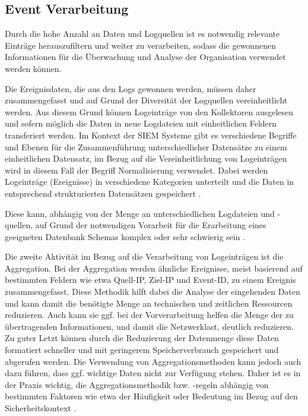 \subsection{Event Verarbeitung}
\label{cha:Event Verarbeitung}
Durch die hohe Anzahl an Daten und Logquellen ist es notwendig relevante Einträge herauszufiltern und weiter zu verarbeiten, sodass die gewonnenen Informationen für die Überwachung und Analyse der Organisation verwendet werden können.

Die Ereignisdaten, die aus den Logs gewonnen werden, müssen daher zusammengefasst und auf Grund der Diversität der Logquellen vereinheitlicht werden. Aus diesem Grund können Logeinträge von den Kollektoren ausgelesen und sofern möglich die Daten in neue Logdateien mit einheitlichen Feldern transferiert werden. Im Kontext der SIEM Systeme gibt es verschiedene Begriffe und Ebenen für die Zusammenführung unterschiedlicher Datensätze zu einem einheitlichen Datensatz, im Bezug auf die Vereinheitlichung von Logeinträgen wird in diesem Fall der Begriff \glqq Normalisierung \grqq  verwendet. Dabei werden Logeinträge (Ereignisse) in verschiedene Kategorien unterteilt und die Daten in entsprechend strukturierten Datensätzen gespeichert \citep{EP1}.

Diese kann, abhängig von der Menge an unterschiedlichen Logdateien und -quellen, auf Grund der notwendigen Vorarbeit für die Erarbeitung eines geeigneten Datenbank Schemas komplex oder sehr schwierig sein \citep{EP2}.

Die zweite Aktivität im Bezug auf die Verarbeitung von Logeinträgen ist die Aggregation. Bei der Aggregation werden ähnliche Ereignisse, meist basierend auf bestimmten Feldern wie etwa Quell-IP, Ziel-IP und Event-ID, zu einem Ereignis zusammengefasst. Diese Methodik hilft dabei die Analyse der eingehenden Daten und kann damit die benötigte Menge an technischen und zeitlichen Ressourcen reduzieren. Auch kann sie ggf. bei der Vorverarbeitung helfen die Menge der zu übertragenden Informationen, und damit die Netzwerklast, deutlich reduzieren. Zu guter Letzt können durch die Reduzierung der Datenmenge diese Daten formatiert schneller und mit geringerem Speicherverbrauch gespeichert und abgerufen werden.
Die Verwendung von Aggregationsmethoden kann jedoch auch dazu führen, dass ggf. wichtige Daten nicht zur Verfügung stehen. Daher ist es in der Praxis wichtig, die Aggregationsmethodik bzw. -regeln abhängig von bestimmten Faktoren wie etwa der Häufigkeit oder Bedeutung im Bezug auf den Sicherheitskontext \citep{EP3}.

